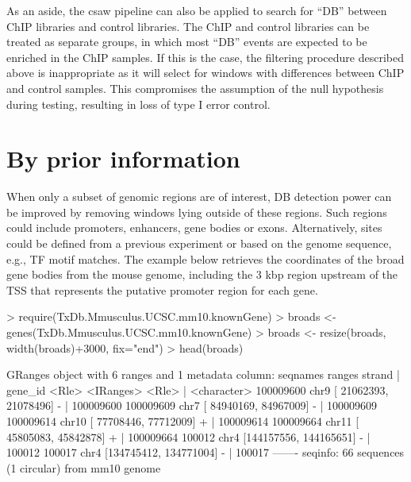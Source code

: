 \documentclass[12pt]{report}
\renewenvironment{Schunk}{\vspace{0pt}}{\vspace{0pt}}
\newcommand{\pkgname}{csaw}
\begin{document}
As an aside, the \pkgname{} pipeline can also be applied to search for ``DB'' between ChIP libraries and control libraries. 
The ChIP and control libraries can be treated as separate groups, in which most ``DB'' events are expected to be enriched in the ChIP samples. 
If this is the case, the filtering procedure described above is inappropriate as it will select for windows with differences between ChIP and control samples. 
This compromises the assumption of the null hypothesis during testing, resulting in loss of type I error control.


\section{By prior information}
When only a subset of genomic regions are of interest, DB detection power can be improved by removing windows lying outside of these regions. 
Such regions could include promoters, enhancers, gene bodies or exons. 
Alternatively, sites could be defined from a previous experiment or based on the genome sequence, e.g., TF motif matches.
The example below retrieves the coordinates of the broad gene bodies from the mouse genome, including the 3 kbp region upstream of the TSS that represents the putative promoter region for each gene. 

\begin{Schunk}
\begin{Sinput}
> require(TxDb.Mmusculus.UCSC.mm10.knownGene)
> broads <- genes(TxDb.Mmusculus.UCSC.mm10.knownGene)
> broads <- resize(broads, width(broads)+3000, fix="end")
> head(broads)
\end{Sinput}
\begin{Soutput}
GRanges object with 6 ranges and 1 metadata column:
            seqnames                 ranges strand |     gene_id
               <Rle>              <IRanges>  <Rle> | <character>
  100009600     chr9 [ 21062393,  21078496]      - |   100009600
  100009609     chr7 [ 84940169,  84967009]      - |   100009609
  100009614    chr10 [ 77708446,  77712009]      + |   100009614
  100009664    chr11 [ 45805083,  45842878]      + |   100009664
     100012     chr4 [144157556, 144165651]      - |      100012
     100017     chr4 [134745412, 134771004]      - |      100017
  -------
  seqinfo: 66 sequences (1 circular) from mm10 genome
\end{Soutput}
\end{Schunk}
 
\end{document}
